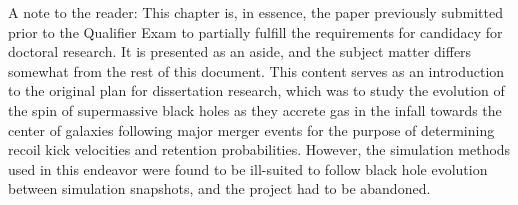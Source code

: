 
%
%
%
%


A note to the reader:  This chapter is, in essence, the paper previously submitted prior to the Qualifier Exam to partially fulfill the requirements for candidacy for doctoral research.  It is presented as an aside, and the subject matter differs somewhat from the rest of this document.  This content serves as an introduction to the original plan for dissertation research, which was to study the evolution of the spin of supermassive black holes as they accrete gas in the infall towards the center of galaxies following major merger events for the purpose of determining recoil kick velocities and retention probabilities.  However, the simulation methods used in this endeavor were found to be ill-suited to follow black hole evolution between simulation snapshots, and the project had to be abandoned.




